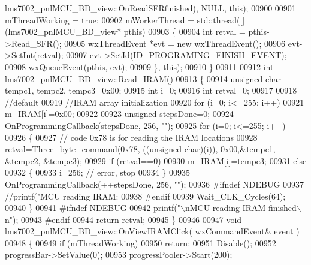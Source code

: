 \begin{DoxyCode}
{{{{{{{{{{{{{{{      lms7002_pnlMCU_BD_view::OnReadSFRfinished), NULL, \textcolor{keyword}{this});
00900 
00901     mThreadWorking = \textcolor{keyword}{true};
00902     mWorkerThread = std::thread([](lms7002_pnlMCU_BD_view* pthis)
00903     \{
00904         \textcolor{keywordtype}{int} retval = pthis->Read_SFR();
00905         wxThreadEvent *evt = \textcolor{keyword}{new} wxThreadEvent();
00906         evt->SetInt(retval);
00907         evt->SetId(ID_PROGRAMING_FINISH_EVENT);
00908         wxQueueEvent(pthis, evt);
00909     \}, \textcolor{keyword}{this});
00910 \}
00911 
00912 \textcolor{keywordtype}{int} lms7002_pnlMCU_BD_view::Read_IRAM()
00913 \{
00914     \textcolor{keywordtype}{unsigned} \textcolor{keywordtype}{char} tempc1, tempc2, tempc3=0x00;
00915     \textcolor{keywordtype}{int} i=0;
00916     \textcolor{keywordtype}{int} retval=0;
00917 
00918     \textcolor{comment}{//default}
00919     \textcolor{comment}{//IRAM array initialization}
00920     \textcolor{keywordflow}{for} (i=0; i<=255; i++)
00921             m_IRAM[i]=0x00;
00922 
00923     \textcolor{keywordtype}{unsigned} stepsDone=0;
00924     OnProgrammingCallback(stepsDone, 256, \textcolor{stringliteral}{""});
00925     \textcolor{keywordflow}{for} (i=0; i<=255; i++)
00926     \{
00927         \textcolor{comment}{// code 0x78 is for reading the IRAM locations}
00928         retval=Three_byte_command(0x78, ((\textcolor{keywordtype}{unsigned} \textcolor{keywordtype}{char})(i)), 0x00,&tempc1, &tempc2, &tempc3);
00929         \textcolor{keywordflow}{if} (retval==0)
00930             m_IRAM[i]=tempc3;
00931         \textcolor{keywordflow}{else}
00932         \{
00933             i=256; \textcolor{comment}{// error, stop}
00934         \}
00935        OnProgrammingCallback(++stepsDone, 256, \textcolor{stringliteral}{""});
00936 \textcolor{preprocessor}{#ifndef NDEBUG}
00937         \textcolor{comment}{//printf("MCU reading IRAM: %
00938 \textcolor{preprocessor}{#endif}
00939         Wait_CLK_Cycles(64);
00940     \}
00941 \textcolor{preprocessor}{#ifndef NDEBUG}
00942     printf(\textcolor{stringliteral}{"\(\backslash\)nMCU reading IRAM finished\(\backslash\)n"});
00943 \textcolor{preprocessor}{#endif}
00944     \textcolor{keywordflow}{return} retval;
00945 \}
00946 
00947 \textcolor{keywordtype}{void} lms7002_pnlMCU_BD_view::OnViewIRAMClick( wxCommandEvent& event )
00948 \{
00949     \textcolor{keywordflow}{if} (mThreadWorking)
00950         \textcolor{keywordflow}{return};
00951     Disable();
00952     progressBar->SetValue(0);
00953     progressPooler->Start(200);
}}}}}}}}}}}}}}}}
\end{DoxyCode}
